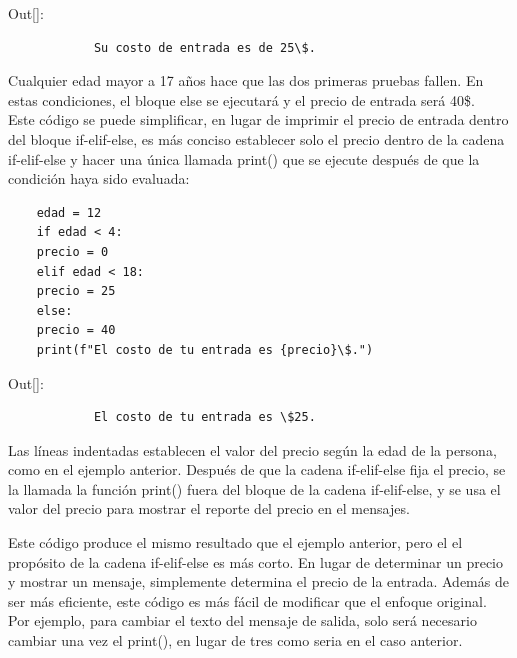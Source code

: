 {\ttfamily\scriptsize\noindent Out[]: \vspace{-0.3cm}	
	{\color{blue} 	
		\begin{verbatim}
			Su costo de entrada es de 25\$.			
		\end{verbatim}
}} 

\noindent Cualquier edad mayor a 17 años hace que las dos primeras pruebas fallen. En estas
condiciones, el bloque {\ttfamily else} se ejecutará y el precio de entrada será 40\$.\\

Este código se puede simplificar, en lugar de imprimir el precio de entrada dentro del bloque {\ttfamily  if-elif-else}, es más conciso establecer solo el precio dentro de la cadena {\ttfamily  if-elif-else} y hacer una única llamada {\ttfamily print()} que se ejecute después de que la condición haya sido evaluada:

\hspace{-2.2cm}{\ttfamily \scriptsize parque.py}\vspace{-0.52cm}
\begin{lstlisting}		
	edad = 12
	if edad < 4:
	precio = 0
	elif edad < 18:
	precio = 25
	else:
	precio = 40
	print(f"El costo de tu entrada es {precio}\$.")
\end{lstlisting} 

{\ttfamily\scriptsize\noindent Out[]: \vspace{-0.3cm}	
	{\color{blue} 	
		\begin{verbatim}
			El costo de tu entrada es \$25.			
		\end{verbatim}
}} 

Las líneas indentadas establecen el valor del precio según la edad de la persona,
como en el ejemplo anterior.  Después de que la cadena  {\ttfamily  if-elif-else} fija el precio, se la llamada la función {\ttfamily print()} fuera del bloque de la cadena {\ttfamily  if-elif-else}, y se  usa el valor del  precio para mostrar el reporte del precio en el mensajes.

Este código produce el mismo resultado que el ejemplo anterior, pero el
el propósito de la cadena {\ttfamily  if-elif-else} es más corto. En lugar de determinar un precio
y mostrar un mensaje, simplemente determina el precio de la entrada. Además de ser más eficiente, este código  es más fácil de modificar que el enfoque original. Por ejemplo, para cambiar el texto del mensaje de salida, solo será necesario cambiar una vez el {\ttfamily print()}, en lugar de tres como seria en el caso anterior.


